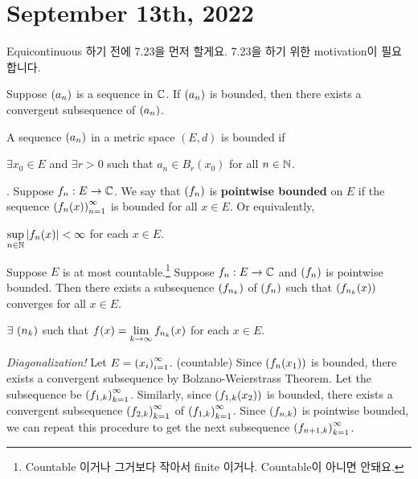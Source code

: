 \section*{September 13th, 2022}

Equicontinuous 하기 전에 7.23을 먼저 할게요. 7.23을 하기 위한 motivation이 필요합니다.

\recall {} Suppose \(\left( a_n \right)\) is a sequence in \(\mathbb{C}\). If \(\left( a_n \right)\) is bounded, then there exists a convergent subsequence of \(\left( a_n \right)\).

\recall A sequence \(\left( a_n \right)\) in a metric space \((E, d)\) is bounded if
\begin{center}
    \(\exists x_0 \in E\) and \(\exists r > 0\) such that \(a_n \in B_r(x_0)\) for all \(n \in \mathbb{N}\).
\end{center}

.  Suppose \(f_n: E \rightarrow \mathbb{C}\). We say that \(\left( f_n \right)\) is \textbf{pointwise bounded} on \(E\) if the sequence \(\left( f_n(x) \right)_{n=1}^\infty\) is bounded for all \(x \in E\). Or equivalently,
\begin{center}
    \(\displaystyle \sup_{n \in \mathbb{N}} \left| f_n(x) \right| < \infty\) for each \(x \in E\).
\end{center}

 Suppose \(E\) is at most countable.\footnote{Countable 이거나 그거보다 작아서 finite 이거나. Countable이 아니면 안돼요.} Suppose \(f_n: E \rightarrow \mathbb{C}\) and \(\left( f_n \right)\) is pointwise bounded. Then there exists a subsequence \(\left( f_{n_k} \right)\) of \(\left( f_n \right)\) such that \(\left( f_{n_k}(x) \right)\) converges for all \(x \in E\).
\begin{center}
    \(\exists \seq{n_k}\) such that \(f(x) = \displaystyle \lim_{k \rightarrow\infty} f_{n_k}(x)\) for each \(x \in E\). %
\end{center}

\pf \textit{Diagonalization!} Let \(E = \left( x_i \right)_{i=1}^\infty\). (countable) Since \(\left( f_n(x_1) \right)\) is bounded, there exists a convergent subsequence by Bolzano-Weierstrass Theorem. Let the subsequence be \(\left( f_{1, k} \right)_{k=1}^\infty\). Similarly, since \(\left( f_{1, k}(x_2) \right)\) is bounded, there exists a convergent subsequence \(\left( f_{2, k} \right)_{k=1}^\infty\) of \(\left( f_{1, k} \right)_{k=1}^\infty\). Since \(\left( f_{n, k} \right)\) is pointwise bounded, we can repeat this procedure to get the next subsequence \(\left( f_{n+1, k} \right)_{k=1}^\infty\).

